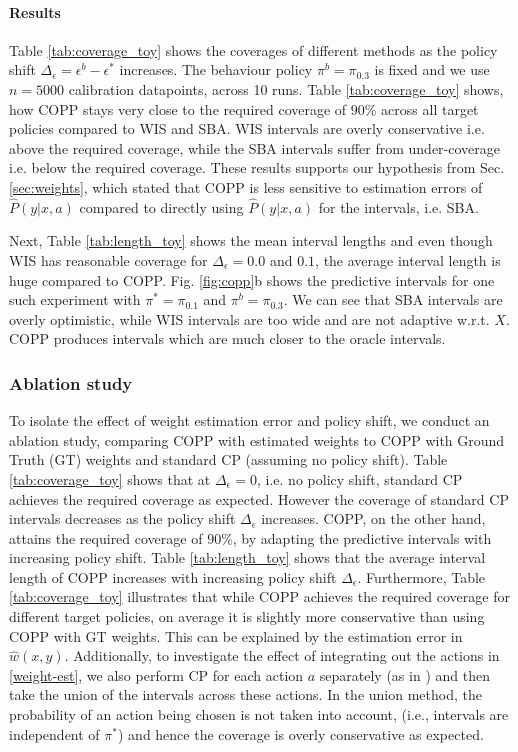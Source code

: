 \paragraph{Results} Table \ref{tab:coverage_toy} shows the coverages of different methods as the policy shift $\Delta_{\epsilon}=\epsilon^b - \epsilon^*$ increases. The behaviour policy $\pi^b = \pi_{0.3}$ is fixed and we use $n=5000$ calibration datapoints, across 10 runs. Table \ref{tab:coverage_toy} shows, how COPP stays very close to the required coverage of $90\%$ across all target policies compared to WIS and SBA. WIS intervals are overly conservative i.e. above the required coverage, while the SBA intervals suffer from under-coverage i.e. below the required coverage. These results supports our hypothesis from Sec. \ref{sec:weights}, which stated that COPP is less sensitive to estimation errors of $\hat{P}(y|x, a)$ compared to directly using $\hat{P}(y|x, a)$ for the intervals, i.e. SBA. 

Next, Table \ref{tab:length_toy} shows the mean interval lengths and even though WIS has reasonable coverage for $\Delta_{\epsilon}=0.0$ and $0.1$, the average interval length is huge compared to COPP. Fig. \ref{fig:copp}b shows the predictive intervals for one such experiment with $\pi^* = \pi_{0.1}$ and $\pi^b = \pi_{0.3}$. We can see that SBA intervals are overly optimistic, while WIS intervals are too wide and are not adaptive w.r.t. $X$. COPP produces intervals which are much closer to the oracle intervals. 

\subsubsection{Ablation study} 

To isolate the effect of weight estimation error and policy shift, we conduct an ablation study, comparing COPP with estimated weights to COPP with Ground Truth (GT) weights and standard CP (assuming no policy shift). Table \ref{tab:coverage_toy} shows that at $\Delta_\epsilon = 0$, i.e. no policy shift, standard CP achieves the required coverage as expected. However the coverage of standard CP intervals decreases as the policy shift $\Delta_\epsilon$ increases. COPP, on the other hand, attains the required coverage of $90\%$, by adapting the predictive intervals with increasing policy shift. Table \ref{tab:length_toy} shows that the average interval length of COPP increases with increasing policy shift $\Delta_\epsilon$. Furthermore, Table \ref{tab:coverage_toy} illustrates that while COPP achieves the required coverage for different target policies, on average it is slightly more conservative than using COPP with GT weights. This can be explained by the estimation error in $\hat{w}(x,y)$. Additionally, to investigate the effect of integrating out the actions in \eqref{weight-est}, we also perform CP for each action $a$ separately (as in \cite{lei2020conformal}) and then take the union of the intervals across these actions. In the union method, the probability of an action being chosen is not taken into account, (i.e., intervals are independent of $\pi^*$) and hence the coverage is overly conservative as expected.


